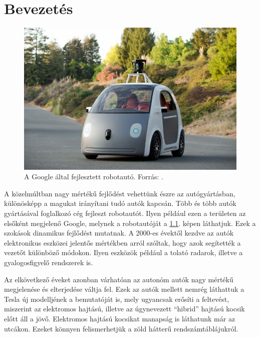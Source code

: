 \documentclass[a4paper,12pt]{report}
\begin{document}
\chapter{Bevezetés}

\begin{figure}[ht]
\centerline{
\includegraphics[width=6in]{img/googleauto}}
\caption{A Google által fejlesztett robotautó. Forrás: \cite{googlecarimage}.}
\label{googleauto}
\end{figure}

A közelmúltban nagy mértékű fejlődést vehettünk észre az autógyártásban, különösképp a magukat irányítani tudó autók kapcsán. Több és több autók gyártásával foglalkozó cég fejleszt robotautót. Ilyen például ezen a területen az elsőként megjelenő Google, melynek a robotautóját a \ref{googleauto}. képen láthatjuk. Ezek a szokások dinamikus fejlődést mutatnak. A 2000-es évektől kezdve az autók elektronikus eszközei jelentős mértékben arról szóltak, hogy azok segítették a vezetőt különböző módokon. Ilyen eszközök például a tolató radarok, illetve a gyalogosfigyelő rendszerek is. 

\vspace{2mm}
Az elkövetkező éveket azonban várhatóan az autonóm autók nagy mértékű megjelenése és elterjedése váltja fel. Ezek az autók mellett nemrég láthattuk a Tesla új modelljének a bemutatóját is, mely ugyancsak erősíti a feltevést, miszerint az elektromos hajtású, illetve az úgynevezett ``hibrid'' hajtású kocsik előtt áll a jövő. Elektromos hajtású kocsikat manapság is láthatunk már az utcákon. Ezeket könnyen felismerhetjük a zöld hátterű rendszámtáblájukról.
\end{document}
